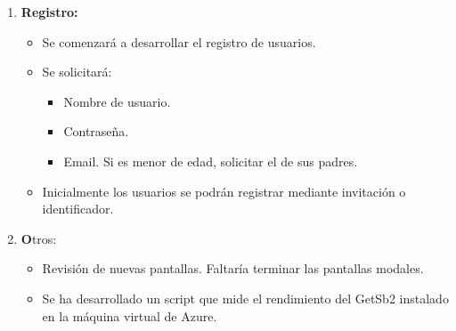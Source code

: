 \documentclass[a4paper,12pt]{letter}
\begin{document}
\begin{letter}
\begin{enumerate}
  
    \vspace{0.5cm}
	\item {\textbf {Registro:}}
    \begin{itemize}
        \item {Se comenzará a desarrollar el registro de usuarios.}
        \item {Se solicitará:}
        \begin{itemize}
        \item {Nombre de usuario.}
        \item {Contraseña.}
        \item {Email. Si es menor de edad, solicitar el de sus padres.}
    \end{itemize}
    \item {Inicialmente los usuarios se podrán registrar mediante invitación o identificador.}
    \end{itemize}

    \item {\textbf Otros:}
        \begin{itemize}
            \item {Revisión de nuevas pantallas. Faltaría terminar las pantallas modales.}
            \item {Se ha desarrollado un script que mide el rendimiento del GetSb2 instalado en la máquina virtual de Azure.}
        \end{itemize}
\end{enumerate}



\end{letter}
\end{document}
